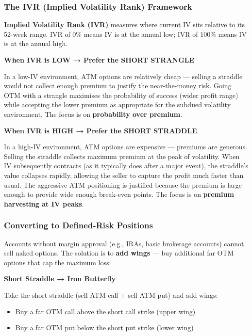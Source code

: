 \documentclass[12pt,openany]{book}
\begin{document}
\subsubsection{The IVR (Implied Volatility Rank) Framework}

\textbf{Implied Volatility Rank (IVR)} measures where current IV sits relative to its 52-week range. IVR of 0\% means IV is at the annual low; IVR of 100\% means IV is at the annual high.

\textbf{When IVR is LOW → Prefer the SHORT STRANGLE}

In a low-IV environment, ATM options are relatively cheap — selling a straddle would not collect enough premium to justify the near-the-money risk. Going OTM with a strangle maximises the probability of success (wider profit range) while accepting the lower premium as appropriate for the subdued volatility environment. The focus is on \textbf{probability over premium}.

\textbf{When IVR is HIGH → Prefer the SHORT STRADDLE}

In a high-IV environment, ATM options are expensive — premiums are generous. Selling the straddle collects maximum premium at the peak of volatility. When IV subsequently contracts (as it typically does after a major event), the straddle's value collapses rapidly, allowing the seller to capture the profit much faster than usual. The aggressive ATM positioning is justified because the premium is large enough to provide wide enough break-even points. The focus is on \textbf{premium harvesting at IV peaks}.



\subsubsection{Converting to Defined-Risk Positions}

Accounts without margin approval (e.g., IRAs, basic brokerage accounts) cannot sell naked options. The solution is to \textbf{add wings} — buy additional far OTM options that cap the maximum loss:

\textbf{Short Straddle → Iron Butterfly}

Take the short straddle (sell ATM call + sell ATM put) and add wings:
\begin{itemize}[leftmargin=*]
    \item Buy a far OTM call above the short call strike (upper wing)
    \item Buy a far OTM put below the short put strike (lower wing)
\end{itemize}
\end{document}
